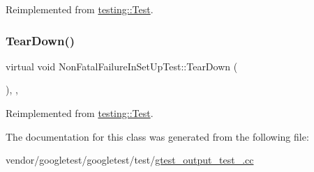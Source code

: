 Reimplemented from \hyperlink{classtesting_1_1_test_a190315150c303ddf801313fd1a777733}{testing\+::\+Test}.

\mbox{\label{class_non_fatal_failure_in_set_up_test_a36abc808b11afc6a9bfa20dac5c28c30}} 
\subsubsection{\texorpdfstring{Tear\+Down()}{TearDown()}}
{\footnotesize\ttfamily virtual void Non\+Fatal\+Failure\+In\+Set\+Up\+Test\+::\+Tear\+Down (\begin{DoxyParamCaption}{ }\end{DoxyParamCaption})\hspace{0.3cm}{\ttfamily [inline]}, {\ttfamily [protected]}, {\ttfamily [virtual]}}



Reimplemented from \hyperlink{classtesting_1_1_test_a5f0ab439802cbe0ef7552f1a9f791923}{testing\+::\+Test}.



The documentation for this class was generated from the following file\+:\begin{DoxyCompactItemize}
\item 
vendor/googletest/googletest/test/\hyperlink{gtest__output__test___8cc}{gtest\+\_\+output\+\_\+test\+\_\+.\+cc}\end{DoxyCompactItemize}
